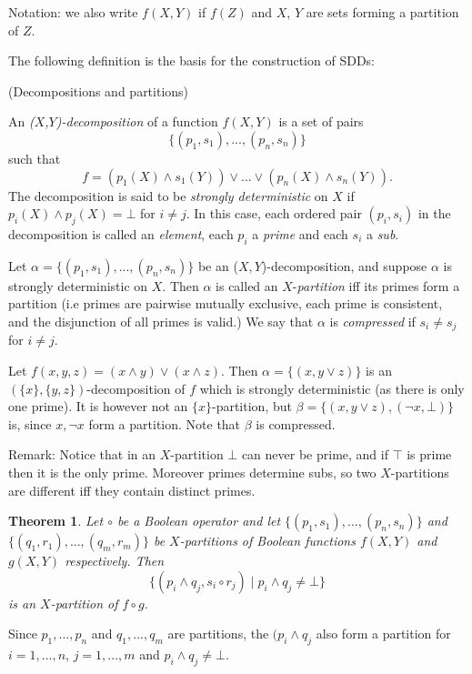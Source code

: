 \documentclass[12]{article}
\newtheorem{theorem}{Theorem}[section]
\newenvironment{proof}[1][Proof]{\begin{trivlist}
\item[\hskip \labelsep {\bfseries #1}]}{\end{trivlist}}
\newenvironment{definition}[1][Definition]{\begin{trivlist}
\item[\hskip \labelsep {\bfseries #1}]}{\end{trivlist}}
\newenvironment{example}[1][Example]{\begin{trivlist}
\item[\hskip \labelsep {\bfseries #1}]}{\end{trivlist}}
\begin{document}
\noindent Notation: we also write $f(X, Y)$ if $f(Z)$ and $X$, $Y$ are sets forming a partition of $Z$.

The following definition is the basis for the construction of SDDs:

\begin{definition} (Decompositions and partitions)

An \textit{($X$,$Y$)-decomposition} of a function $f(X, Y)$ is a set of pairs $$\{(p_1, s_1),...,(p_n, s_n)\}$$ such that $$ f = (p_1(X) \land s_1(Y)) \lor ... \lor (p_n(X) \land s_n(Y)).$$
The decomposition is said to be \textit{strongly deterministic} on $X$ if $p_i(X) \land p_j(X) = \bot$ for $i \neq j$. In this case, each ordered pair $(p_i, s_i)$ in the decomposition is called an \textit{element}, each $p_i$ a \textit{prime} and each $s_i$ a \textit{sub}.

Let $\alpha = \{(p_1, s_1),...,(p_n, s_n)\}$ be an ($X,Y$)-decomposition, and suppose $\alpha$ is strongly deterministic on $X$.
Then $\alpha$ is called an $X$-\textit{partition} iff its primes form a partition (i.e primes are pairwise mutually exclusive, each prime is consistent, and the disjunction of all primes is valid.)
We say that $\alpha$ is \textit{compressed} if $s_i \neq s_j$ for $i \neq j$.
\end{definition}

\begin{example} 
Let $f(x, y, z) = (x \land y) \lor (x \land z)$. Then $\alpha = \{(x, y\lor z)\}$ is an $(\{x\}, \{y, z\})$-decomposition of $f$ which is strongly deterministic (as there is only one prime). It is however not an $\{x\}$-partition, but $\beta = \{(x, y\lor z), (\lnot x, \bot)\}$ is, since $x, \lnot x$ form a partition. Note that $\beta$ is compressed. 
\end{example}

\noindent Remark: Notice that in an $X$-partition $\bot$ can never be prime, and if $\top$ is prime then it is the only prime. Moreover primes determine subs, so two $X$-partitions are different iff they contain distinct primes.

\begin{theorem}
\label{theorem_apply}
Let $\circ$ be a Boolean operator and let $\{(p_1, s_1),...,(p_n, s_n)\}$ and $\{(q_1, r_1),...,(q_m, r_m)\}$  be $X$-partitions of Boolean functions $f(X, Y)$ and $g(X, Y)$ respectively. Then $$\{(p_i \land q_j, s_i \circ r_j) \mid  p_i \land q_j  \neq \bot \}$$ is an $X$-partition of $f \circ g$.
\end{theorem}
\begin{proof}
 Since $p_1, ..., p_n$ and $q_1, ..., q_m$ are partitions, the $(p_i \land q_j$ also form a partition for $i = 1, ..., n$, $j = 1, ..., m$ and $p_i \land q_j \neq \bot$. 
\end{proof}
\end{document}
